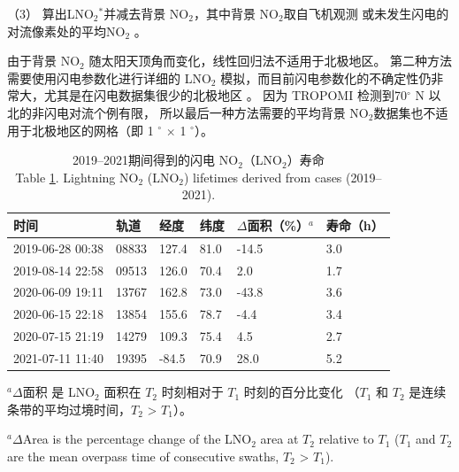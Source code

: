 （3） 算出LNO$_2$$^*$并减去背景 NO$_2$，其中背景 NO$_2$取自飞机观测 \citep{Pickering.2016,Perez-Invernon.2022} 或未发生闪电的对流像素处的平均NO$_2$ \citep{Bucsela.2019,Bucsela.2010,Allen.2021a}。

由于背景 NO$_2$ 随太阳天顶角而变化，线性回归法不适用于北极地区。
第二种方法需要使用闪电参数化进行详细的 LNO$_2$ 模拟，而目前闪电参数化的不确定性仍非常大\citep{Finney.2018,Romps.2019,Chen.2021a}，尤其是在闪电数据集很少的北极地区 \citep{Holzworth.2021}。
因为 TROPOMI 检测到70$^{\circ}$ N 以北的非闪电对流个例有限，
所以最后一种方法需要的平均背景 NO$_2$数据集也不适用于北极地区的网格（即 1 $^{\circ}$ $\times$ 1 $^{\circ}$）。


\begin{table}[H]
\centering
\caption{2019--2021期间得到的闪电 NO$_2$（LNO$_2$）寿命\\
Table \ref{table:lifetime}. Lightning NO$_2$ (LNO$_2$) lifetimes derived from cases (2019--2021).}
\label{table:lifetime}
\footnotesize
{\centering
\begin{tabular}{llllll}
\hline
时间             &         轨道 &    经度 &   纬度 &  $\Delta$面积（\%）$^a$ &  寿命（h）\\
\hline
2019-06-28 00:38 &       08833 &  127.4 &  81.0 &     -14.5 &       3.0 \\
2019-08-14 22:58 &       09513 &  126.0 &  70.4 &       2.0 &       1.7 \\
2020-06-09 19:11 &       13767 &  162.8 &  73.0 &     -43.8 &       3.6 \\
2020-06-15 22:18 &       13854 &  155.6 &  78.7 &      -4.4 &       3.4 \\
2020-07-15 21:19 &       14279 &  109.3 &  75.4 &       4.5 &       2.7 \\
2021-07-11 11:40 &       19395 &  -84.5 &  70.9 &      28.0 &       5.2 \\
\hline
\end{tabular}
\par }
\begin{tablenotes}
\linespread{1}\footnotesize
\item $^a$$\Delta$面积 是 LNO$_2$ 面积在 $T_2$ 时刻相对于 $T_1$ 时刻的百分比变化
（$T_1$ 和 $T_2$ 是连续条带的平均过境时间，$T_2$ > $T_1$）。
\item $^a$$\Delta$Area is the percentage change of the LNO$_2$ area at $T_2$ relative to $T_1$
($T_1$ and $T_2$ are the mean overpass time of consecutive swaths, $T_2$ > $T_1$).
\end{tablenotes}
\end{table}

